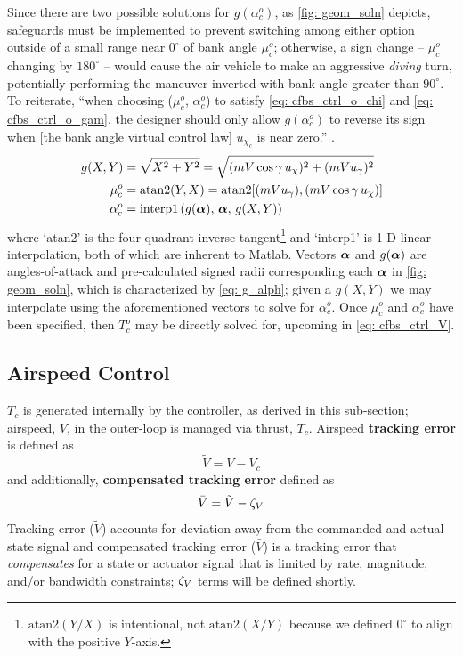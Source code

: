 \documentclass[12pt]{ucthesis}
\begin{document}
Since there are two possible solutions for $g(\alpha^o_c)$, as \autoref{fig: geom_soln} depicts, safeguards must be implemented to prevent switching among either option outside of a small range near $0^{\circ}$ of bank angle $\mu^o_c$; otherwise, a sign change -- $\mu^o_c$ changing by $180^{\circ}$ -- would cause the air vehicle to make an aggressive \textit{diving} turn, potentially performing the maneuver inverted with bank angle greater than $90^{\circ}$. To reiterate, ``when choosing ($\mu^o_c$, $\alpha^o_c$) to satisfy \autoref{eq: cfbs_ctrl_o_chi} and \ref{eq: cfbs_ctrl_o_gam}, the designer should only allow $g(\alpha^o_c)$ to reverse its sign when [the bank angle virtual control law] $u_{\chi_c}$ is near zero.'' \citep{Farrell2006}.
	\begin{align}
		\label{eq: cfbs_gxy} 	g(X,Y) &= \sqrt{X^2 + Y^2} = \sqrt{(m V\cos\gamma\,{u_{\chi}})^2 + (m V{u_{\gamma}})^2 }\\
		\label{eq: cfbs_mu_oc} 	\mu^o_c &= \text{atan2}( Y,X ) =  \text{atan2}[ (m V{u_{\gamma}}),(m V\cos\gamma\,{u_{\chi}}) ]\\
		\label{eq: cfbs_a_oc} 	\alpha^o_c &=  \text{interp1}\left( g(\boldsymbol{\alpha}),\,\boldsymbol{\alpha},\,g(X,Y) \right)
	\end{align}
where `atan2' is the four quadrant inverse tangent\footnote{$\text{atan2}(Y/X)$ is intentional, not $\text{atan2}(X/Y)$ because we defined $0^\circ$ to align with the positive $Y$-axis.} and `interp1' is 1-D linear interpolation, both of which are inherent to Matlab. Vectors $\boldsymbol{\alpha}$ and $g(\boldsymbol{\alpha})$ are angles-of-attack and pre-calculated signed radii corresponding each $\boldsymbol{\alpha}$ in \autoref{fig: geom_soln}, which is characterized by \autoref{eq: g_alph}; given a $g(X,Y)$ we may interpolate using the aforementioned vectors to solve for $\alpha^o_c$. Once $\mu^o_c$ and $\alpha^o_c$ have been specified, then $T^o_c$ may be directly solved for, upcoming in \autoref{eq: cfbs_ctrl_V}.

\subsection{Airspeed Control}
\label{subsec: uav_airspeed}
%
$T_c$ is generated internally by the controller, as derived in this sub-section; airspeed, $V$, in the outer-loop is managed via thrust, $T_c$. Airspeed \textbf{tracking error} is defined as
	\begin{equation} \label{eq: cfbs_V_etrk}
		\tilde{V} 		= V 	- V_c
	\end{equation}
and additionally, \textbf{compensated tracking error} defined as
	\begin{equation} \label{eq: cfbs_V_ecmp}
		\bar{V} 		= \tilde{V} 	- \zeta_V
	\end{equation}
\indent Tracking error ($\tilde{V}$) accounts for deviation away from the commanded and actual state signal and compensated tracking error ($\bar{V}$) is a tracking error that \textit{compensates} for a state or actuator signal that is limited by rate, magnitude, and/or bandwidth constraints; $\zeta_V$ terms will be defined shortly.
\end{document}
